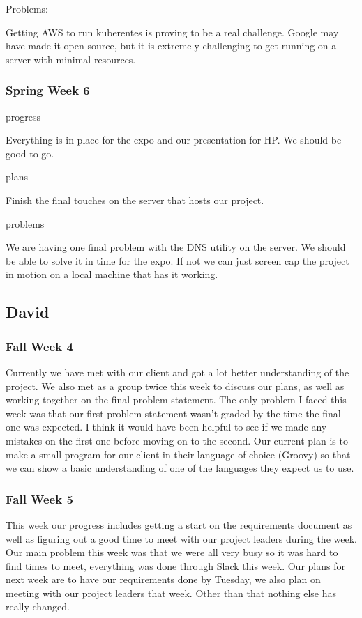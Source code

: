 \documentclass[onecolumn, draftclsnofoot,10pt, compsoc]{IEEEtran}
\begin{document}
Problems:

Getting AWS to run kuberentes is proving to be a real challenge. Google may have made it open source, but it is extremely challenging to get running on a server with minimal resources.

\subsubsection*{Spring Week 6}

progress

Everything is in place for the expo and our presentation for HP. We should be good to go.

plans

Finish the final touches on the server that hosts our project.

problems

We are having one final problem with the DNS utility on the server. We should be able to solve it in time for the expo. If not we can just screen cap the project in motion on a local machine that has it working.

\subsection{David}
\subsubsection*{Fall Week 4}
Currently we have met with our client and got a lot better understanding of the project. We also met as a group twice this week to discuss our plans, as well as working together on the final problem statement. The only problem I faced this week was that our first problem statement wasn't graded by the time the final one was expected. I think it would have been helpful to see if we made any mistakes on the first one before moving on to the second. Our current plan is to make a small program for our client in their language of choice (Groovy) so that we can show a basic understanding of one of the languages they expect us to use.
\subsubsection*{Fall Week 5}
This week our progress includes getting a start on the requirements document as well as figuring out a good time to meet with our project leaders during the week. Our main problem this week was that we were all very busy so it was hard to find times to meet, everything was done through Slack this week. Our plans for next week are to have our requirements done by Tuesday, we also plan on meeting with our project leaders that week. Other than that nothing else has really changed.
\end{document}

